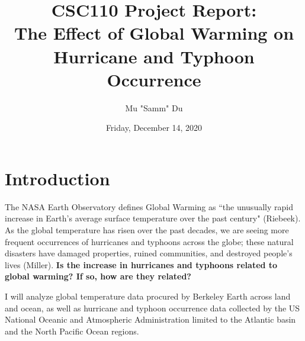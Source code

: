 \documentclass[fontsize=11pt]{article}
\title{CSC110 Project Report: \\The Effect of Global Warming on Hurricane and Typhoon Occurrence}
\author{Mu "Samm" Du}
\date{Friday, December 14, 2020}
\begin{document}
\maketitle

\section*{Introduction}

\qquad The NASA Earth Observatory defines Global Warming as ``the unusually rapid increase in Earth’s average surface temperature over the past century" (Riebeek). As the global temperature has risen over the past decades, we are seeing more frequent occurrences of hurricanes and typhoons across the globe; these natural disasters have damaged properties, ruined communities, and destroyed people's lives (Miller). \textbf{Is the increase in hurricanes and typhoons related to global warming? If so, how are they related?}

\enspace I will analyze global temperature data procured by Berkeley Earth across land and ocean, as well as hurricane and typhoon occurrence data collected by the US National Oceanic and Atmospheric Administration limited to the Atlantic basin and the North Pacific Ocean regions.
\end{document}
